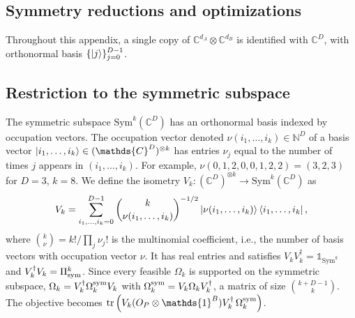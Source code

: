 \documentclass[aps,pra,onecolumn,superscriptaddress]{revtex4-2}
\newcommand{\one}{\mathds{1}}
\newcommand{\I}{\one}
\newcommand{\N}{\mathds{N}}
\newcommand{\C}{\mathds{C}}
\begin{document}
\begin{widetext}
\section{Symmetry reductions and optimizations}\label{app:SymRed}
Throughout this appendix, a single copy of $\C^{d_A}\otimes\C^{d_B}$ is identified with $\C^D$, with orthonormal basis $\{\ket{j}\}_{j=0}^{D-1}$.

\subsection{Restriction to the symmetric subspace}
The symmetric subspace $\text{Sym}^k(\C^D)$ has an orthonormal basis indexed by occupation vectors. The occupation vector denoted $\nu(i_1,\dots,i_k)\in\N^D$ of a basis vector $\ket{i_1,\dots,i_k}\in(\C^D)^{\otimes k}$ has entries $\nu_j$ equal to the number of times $j$ appears in $(i_1,\dots,i_k)$. For example, $\nu(0,1,2,0,0,1,2,2)=(3,2,3)$ for $D=3$, $k=8$. We define the isometry $V_k:(\C^D)^{\otimes k}\to\text{Sym}^k(\C^D)$ as
\begin{equation}
    V_k = \sum_{i_1, \dots, i_k=0}^{D-1} \binom{k}{\nu(i_1, \dots, i_k)}^{-1/2}\ket{\nu(i_1, \dots, i_k)}\bra{i_1, \dots, i_k},
\end{equation}
where $\binom{k}{\nu}=k!/\prod_j\nu_j!$ is the multinomial coefficient, i.e., the number of basis vectors with occupation vector $\nu$. It has real entries and satisfies $V_kV_k^\dagger=\I_{\text{Sym}^k}$ and $V_k^\dagger V_k=\Pi_{\rm sym}^{k}$. Since every feasible $\Omega_k$ is supported on the symmetric subspace, $\Omega_k=V_k^\dagger\Omega_k^{\rm sym}V_k$ with $\Omega_k^{\rm sym}=V_k\Omega_kV_k^\dagger$, a matrix of size $\binom{k+D-1}{k}$. The objective becomes $\tr\left(V_k(O_P\otimes\I^B)V_k^\dagger\,\Omega_k^{\rm sym}\right)$.


\end{widetext}
\end{document}
